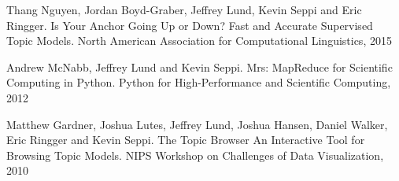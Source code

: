\documentclass[margin]{res}
\begin{document}
\begin{resume}
Thang Nguyen, Jordan Boyd-Graber, Jeffrey Lund, Kevin Seppi and Eric Ringger. Is Your Anchor Going Up or Down? Fast and Accurate Supervised Topic Models. North American Association for Computational Linguistics, 2015

Andrew McNabb, Jeffrey Lund and Kevin Seppi. Mrs: MapReduce for Scientific Computing in Python. Python for High-Performance and Scientific Computing, 2012

Matthew Gardner, Joshua Lutes, Jeffrey Lund, Joshua Hansen, Daniel Walker, Eric Ringger and Kevin Seppi. The Topic Browser An Interactive Tool for Browsing Topic Models. NIPS Workshop on Challenges of Data Visualization, 2010

\end{resume}
\end{document}
